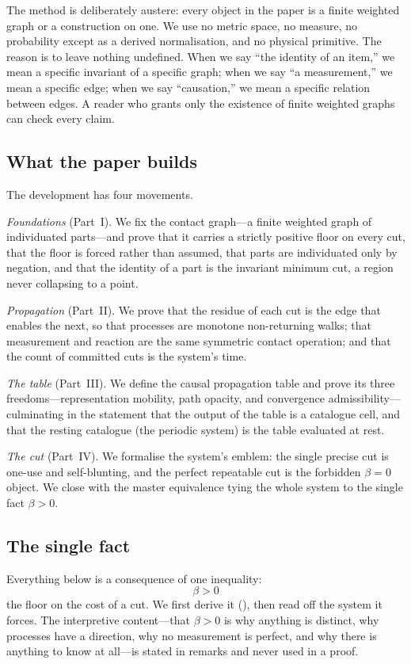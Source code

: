 \documentclass[11pt,twocolumn,a4paper]{article}
\theoremstyle{thmstyle}
\theoremstyle{definition}
\theoremstyle{remark}
\newcommand{\flo}{\beta}                 %
\begin{document}
The method is deliberately austere: every object in the paper is a finite
weighted graph or a construction on one. We use no metric space, no
measure, no probability except as a derived normalisation, and no physical
primitive. The reason is to leave nothing undefined. When we say ``the
identity of an item,'' we mean a specific invariant of a specific graph;
when we say ``a measurement,'' we mean a specific edge; when we say
``causation,'' we mean a specific relation between edges. A reader who
grants only the existence of finite weighted graphs can check every claim.

\subsection{What the paper builds}

The development has four movements.

\emph{Foundations} (Part~I). We fix the contact graph---a finite weighted
graph of individuated parts---and prove that it carries a strictly
positive floor on every cut, that the floor is forced rather than assumed,
that parts are individuated only by negation, and that the identity of a
part is the invariant minimum cut, a region never collapsing to a point.

\emph{Propagation} (Part~II). We prove that the residue of each cut is the
edge that enables the next, so that processes are monotone non-returning
walks; that measurement and reaction are the same symmetric contact
operation; and that the count of committed cuts is the system's time.

\emph{The table} (Part~III). We define the causal propagation table and
prove its three freedoms---representation mobility, path opacity, and
convergence admissibility---culminating in the statement that the
output of the table is a catalogue cell, and that the resting catalogue
(the periodic system) is the table evaluated at rest.

\emph{The cut} (Part~IV). We formalise the system's emblem: the single
precise cut is one-use and self-blunting, and the perfect repeatable cut
is the forbidden $\flo=0$ object. We close with the master equivalence
tying the whole system to the single fact $\flo>0$.

\subsection{The single fact}

Everything below is a consequence of one inequality:
\[
\boxed{\ \flo>0\ }
\]
the floor on the cost of a cut. We first derive it (),
then read off the system it forces. The interpretive content---that
$\flo>0$ is why anything is distinct, why processes have a direction, why
no measurement is perfect, and why there is anything to know at all---is
stated in remarks and never used in a proof.
\end{document}
